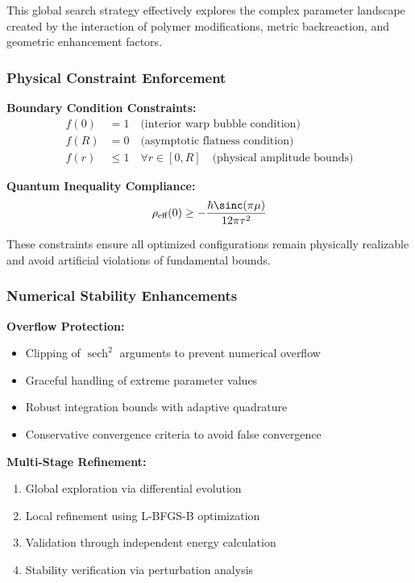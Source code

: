 \documentclass[11pt]{article}
\begin{document}
This global search strategy effectively explores the complex parameter landscape created by the interaction of polymer modifications, metric backreaction, and geometric enhancement factors.

\subsubsection{Physical Constraint Enforcement}

\textbf{Boundary Condition Constraints:}
\begin{align}
f(0) &= 1 \quad \text{(interior warp bubble condition)} \\
f(R) &= 0 \quad \text{(asymptotic flatness condition)} \\
f(r) &\leq 1 \quad \forall r \in [0,R] \quad \text{(physical amplitude bounds)}
\end{align}

\textbf{Quantum Inequality Compliance:}
\begin{equation}
\rho_{\text{eff}}(0) \geq -\frac{\hbar \sinc(\pi\mu)}{12\pi\tau^2}
\end{equation}

These constraints ensure all optimized configurations remain physically realizable and avoid artificial violations of fundamental bounds.

\subsubsection{Numerical Stability Enhancements}

\textbf{Overflow Protection:}
\begin{itemize}
\item Clipping of $\operatorname{sech}^2$ arguments to prevent numerical overflow
\item Graceful handling of extreme parameter values
\item Robust integration bounds with adaptive quadrature
\item Conservative convergence criteria to avoid false convergence
\end{itemize}

\textbf{Multi-Stage Refinement:}
\begin{enumerate}
\item Global exploration via differential evolution
\item Local refinement using L-BFGS-B optimization
\item Validation through independent energy calculation
\item Stability verification via perturbation analysis
\end{enumerate}
\end{document}
